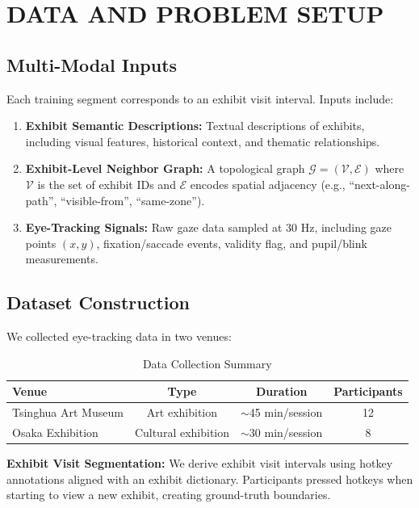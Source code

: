 \documentclass{letterpaper,article}
\begin{document}
\section{DATA AND PROBLEM SETUP}

\subsection{Multi-Modal Inputs}

Each training segment corresponds to an exhibit visit interval. Inputs include:

\begin{enumerate}
    \item \textbf{Exhibit Semantic Descriptions:} Textual descriptions of exhibits, including visual features, historical context, and thematic relationships.
    \item \textbf{Exhibit-Level Neighbor Graph:} A topological graph $\mathcal{G} = (\mathcal{V}, \mathcal{E})$ where $\mathcal{V}$ is the set of exhibit IDs and $\mathcal{E}$ encodes spatial adjacency (e.g., ``next-along-path'', ``visible-from'', ``same-zone'').
    \item \textbf{Eye-Tracking Signals:} Raw gaze data sampled at 30 Hz, including gaze points $(x, y)$, fixation/saccade events, validity flag, and pupil/blink measurements.
\end{enumerate}

\subsection{Dataset Construction}

We collected eye-tracking data in two venues:

\begin{table}[h]
\centering
\caption{Data Collection Summary}
\begin{tabular}{lccc}
\toprule
Venue & Type & Duration & Participants \\
\midrule
Tsinghua Art Museum & Art exhibition & $\sim$45 min/session & 12 \\
Osaka Exhibition & Cultural exhibition & $\sim$30 min/session & 8 \\
\bottomrule
\end{tabular}
\end{table}

\textbf{Exhibit Visit Segmentation:} We derive exhibit visit intervals using hotkey annotations aligned with an exhibit dictionary. Participants pressed hotkeys when starting to view a new exhibit, creating ground-truth boundaries.
\end{document}
